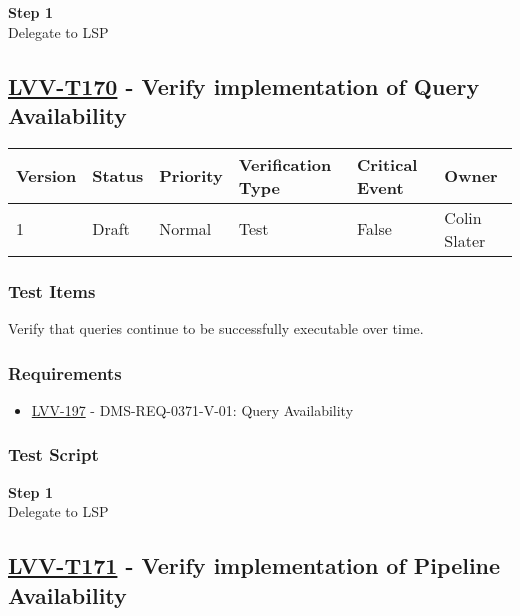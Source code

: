 \textbf{Step 1}\\
Delegate to LSP\\[2\baselineskip]

\hypertarget{lvv-t170---verify-implementation-of-query-availability}{\subsection{\texorpdfstring{\href{https://jira.lsstcorp.org/secure/Tests.jspa\#/testCase/LVV-T170}{LVV-T170}
- Verify implementation of Query
Availability}{LVV-T170 - Verify implementation of Query Availability}}\label{lvv-t170---verify-implementation-of-query-availability}}

\begin{longtable}[]{@{}llllll@{}}
\toprule
Version & Status & Priority & Verification Type & Critical Event &
Owner\tabularnewline
\midrule
\endhead
1 & Draft & Normal & Test & False & Colin Slater\tabularnewline
\bottomrule
\end{longtable}

\subsubsection{Test Items}\label{test-items-34}

Verify that queries continue to be successfully executable over time.

\subsubsection{Requirements}\label{requirements-34}

\begin{itemize}
\tightlist
\item
  \href{https://jira.lsstcorp.org/browse/LVV-197}{LVV-197} -
  DMS-REQ-0371-V-01: Query Availability
\end{itemize}

\subsubsection{Test Script}\label{test-script-34}

\textbf{Step 1}\\
Delegate to LSP\\[2\baselineskip]

\hypertarget{lvv-t171---verify-implementation-of-pipeline-availability}{\subsection{\texorpdfstring{\href{https://jira.lsstcorp.org/secure/Tests.jspa\#/testCase/LVV-T171}{LVV-T171}
- Verify implementation of Pipeline
Availability}{LVV-T171 - Verify implementation of Pipeline Availability}}\label{lvv-t171---verify-implementation-of-pipeline-availability}}


